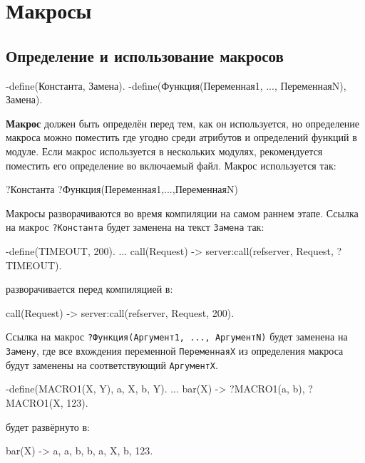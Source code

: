 \chapter{Макросы}
\label{macros}

\section{Определение и использование макросов}

\begin{erlangru}
-define(Константа, Замена).
-define(Функция(Переменная1, ..., ПеременнаяN), Замена).
\end{erlangru}

\textbf{Макрос} должен быть определён перед тем, как он используется, но 
определение макроса можно поместить где угодно среди атрибутов и определений 
функций в модуле.  Если макрос используется в нескольких модулях, рекомендуется 
поместить его определение во включаемый файл.  Макрос используется так:

\begin{erlangru}
?Константа
?Функция(Переменная1,...,ПеременнаяN)
\end{erlangru}

Макросы разворачиваются во время компиляции на самом раннем этапе.
Ссылка на макрос \texttt{?Константа} будет заменена на текст \texttt{Замена} 
так:

\begin{erlang}
-define(TIMEOUT, 200).
...
call(Request) ->
    server:call(refserver, Request, ?TIMEOUT).
\end{erlang}

разворачивается перед компиляцией в:

\begin{erlang}
call(Request) ->
    server:call(refserver, Request, 200).
\end{erlang}

Ссылка на макрос \texttt{?Функция(Аргумент1, ..., АргументN)} будет заменена на
\texttt{Замену}, где все вхождения переменной \texttt{ПеременнаяX} из 
определения макроса будут заменены на соответствующий \texttt{АргументX}.

\begin{erlang}
-define(MACRO1(X, Y), {a, X, b, Y}).
...
bar(X) ->
    ?MACRO1(a, b),
    ?MACRO1(X, 123).
\end{erlang}

будет развёрнуто в:

\begin{erlang}
bar(X) ->
    {a, a, b, b},
    {a, X, b, 123}.
\end{erlang}


